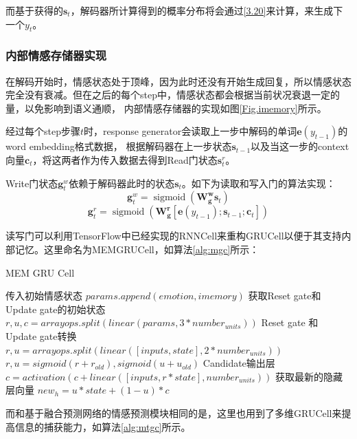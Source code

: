 \documentclass[supercite]{HustGraduPaper}
\theoremstyle{definition}
\begin{document}
而基于获得的$\boldsymbol{s}_t$，解码器所计算得到的概率分布将会通过\ref{3.20}来计算，来生成下一个$y_t$。

\subsubsection{内部情感存储器实现}
在解码开始时，情感状态处于顶峰，因为此时还没有开始生成回复，所以情感状态完全没有衰减。但在之后的每个step中，情感状态都会根据当前状况衰退一定的量，以免影响到语义通顺，
内部情感存储器的实现如图\ref{Fig.imemory}所示。

经过每个step步骤$t$时，response generator会读取上一步中解码的单词$\boldsymbol{e}(y_{t-1})$的word embedding格式数据，
根据解码器在上一步状态$\boldsymbol{s}_{t-1}$以及当这一步的context向量$\boldsymbol{c}_t$，将这两者作为传入数据去得到Read门状态${\boldsymbol{s}_t^r}$。

Write门状态$\boldsymbol{g}_t^w$依赖于解码器此时的状态$\boldsymbol{s}_t$。如下为读取和写入门的算法实现：
$$\boldsymbol { g } _ { t } ^ { w } = \operatorname { sigmoid } \left( \mathbf { W } _ { \mathbf { g } } ^ { \mathbf { w } } \boldsymbol { s } _ { t } \right)$$
$$\boldsymbol { g } _ { t } ^ { r } = \operatorname { sigmoid } \left( \mathbf { W } _ { \mathbf { g } } ^ { \mathbf { r } } \left[ \boldsymbol { e } \left( y _ { t - 1 } \right) ; \boldsymbol { s } _ { t - 1 } ; \boldsymbol { c } _ { t } \right] \right)$$

读写门可以利用TensorFlow中已经实现的RNNCell来重构GRUCell以便于其支持内部记忆。这里命名为MEMGRUCell，如算法\ref{alg:mgc}所示：
\begin{algorithm}
  \caption{MEM GRU Cell}
  \label{alg:mgc}
  \begin{algorithmic}
    \State 传入初始情感状态
    \State $params.append(emotion,imemory)$
    \State 获取Reset gate和Update gate的初始状态
    \State $r, u, c = arrayops.split(linear(params, 3 * number_{units}))$
    \State Reset gate 和 Update gate转换
    \State $r, u = arrayops.split(linear([inputs, state], 2 * number_{units}))$
    \State $r, u = sigmoid(r+r_{old}), sigmoid(u+u_{old})$
    \State Candidate输出层
    \State $c = activation(c+linear([inputs, r * state], number_{units}))$
    \State 获取最新的隐藏层向量
    \State $new_h = u * state + (1 - u) * c$
  \end{algorithmic}
\end{algorithm}

而和基于融合预测网络的情感预测模块相同的是，这里也用到了多维GRUCell来提高信息的捕获能力，如算法\ref{alg:mtgc}所示。
\end{document}
